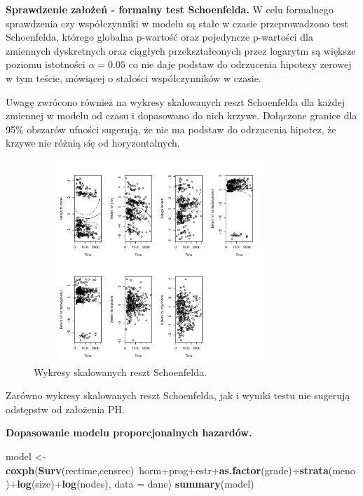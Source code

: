 \documentclass[]{article}
\newenvironment{Shaded}{}{}
\newcommand{\KeywordTok}[1]{\textcolor[rgb]{0.00,0.44,0.13}{\textbf{{#1}}}}
\newcommand{\DataTypeTok}[1]{\textcolor[rgb]{0.56,0.13,0.00}{{#1}}}
\newcommand{\StringTok}[1]{\textcolor[rgb]{0.25,0.44,0.63}{{#1}}}
\newcommand{\NormalTok}[1]{{#1}}
\begin{document}
\textbf{Sprawdzenie założeń - formalny test Schoenfelda.} \newline
W celu formalnego sprawdzenia czy współczynniki w modelu są stałe w
czasie przeprowadzono test Schoenfelda, którego globalna p-wartość oraz
pojedyncze p-wartości dla zmiennych dyskretnych oraz ciągłych
przekształconych przez logarytm są większe  poziomu
istotności $\alpha=0.05$ co nie daje podstaw do odrzucenia hipotezy
zerowej w tym teście, mówiącej o stałości współczynników w czasie.

Uwagę zwrócono również na wykresy skalowanych reszt Schoenfelda dla
każdej zmiennej w modelu od czasu i dopasowano do nich krzywe. Dołączone
granice dla 95\% obszarów ufności sugerują, że nie ma podstaw do
odrzucenia hipotez, że krzywe nie różnią się od horyzontalnych.

\begin{figure}[hbt!]
\vspace{-10pt}
  \begin{center}
      \includegraphics[width=0.85\textwidth, height=3in]{skal_res_shen.pdf}
      \caption{Wykresy skalowanych reszt Schoenfelda.}
   \end{center}
\end{figure}

Zarówno wykresy skalowanych reszt Schoenfelda, jak i wyniki testu nie
sugerują odstępstw od założenia PH.

\textbf{Dopasowanie modelu proporcjonalnych hazardów.} \newline

\begin{Shaded}
\begin{Highlighting}[]
\NormalTok{model <-}\StringTok{ }\KeywordTok{coxph}\NormalTok{(}\KeywordTok{Surv}\NormalTok{(rectime,censrec)~horm+prog+estr+}\KeywordTok{as.factor}\NormalTok{(grade)+}\KeywordTok{strata}\NormalTok{(meno)+}\KeywordTok{log}\NormalTok{(size)+}\KeywordTok{log}\NormalTok{(nodes), }
               \DataTypeTok{data =} \NormalTok{dane) }
\KeywordTok{summary}\NormalTok{(model)}
\end{Highlighting}
\end{Shaded}
\end{document}
